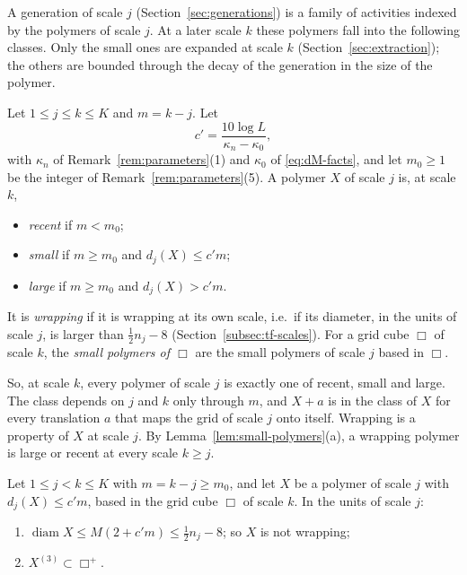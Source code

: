A generation of scale $j$ (Section~\ref{sec:generations}) is a family of activities indexed by the polymers of scale $j$. At a later scale $k$ these polymers fall into the following classes. Only the small ones are expanded at scale $k$ (Section~\ref{sec:extraction}); the others are bounded through the decay of the generation in the size of the polymer.

\begin{definition}\label{def:polymer-classes}
Let $1\le j\le k\le K$ and $m=k-j$. Let
\[
c'=\frac{10\log L}{\kappa_n-\kappa_0},
\]
with $\kappa_n$ of Remark~\ref{rem:parameters}(1) and $\kappa_0$ of \eqref{eq:dM-facts}, and let $m_0\ge1$ be the integer of Remark~\ref{rem:parameters}(5). A polymer $X$ of scale $j$ is, at scale $k$,
\begin{itemize}
\item \emph{recent} if $m<m_0$;
\item \emph{small} if $m\ge m_0$ and $d_j(X)\le c'm$;
\item \emph{large} if $m\ge m_0$ and $d_j(X)>c'm$.
\end{itemize}
It is \emph{wrapping} if it is wrapping at its own scale, i.e.\ if its diameter, in the units of scale $j$, is larger than $\frac12n_j-8$ (Section~\ref{subsec:tf-scales}). For a grid cube $\Box$ of scale $k$, the \emph{small polymers of $\Box$} are the small polymers of scale $j$ based in $\Box$.
\end{definition}

So, at scale $k$, every polymer of scale $j$ is exactly one of recent, small and large. The class depends on $j$ and $k$ only through $m$, and $X+a$ is in the class of $X$ for every translation $a$ that maps the grid of scale $j$ onto itself. Wrapping is a property of $X$ at scale $j$. By Lemma~\ref{lem:small-polymers}(a), a wrapping polymer is large or recent at every scale $k\ge j$.

\begin{lemma}\label{lem:small-polymers}
Let $1\le j<k\le K$ with $m=k-j\ge m_0$, and let $X$ be a polymer of scale $j$ with $d_j(X)\le c'm$, based in the grid cube $\Box$ of scale $k$. In the units of scale $j$:
\begin{enumerate}[label=(\alph*)]
\item $\operatorname{diam}X\le M(2+c'm)\le\frac12n_j-8$; so $X$ is not wrapping;
\item $X^{(3)}\subset\Box^+$.
\end{enumerate}
\end{lemma}


